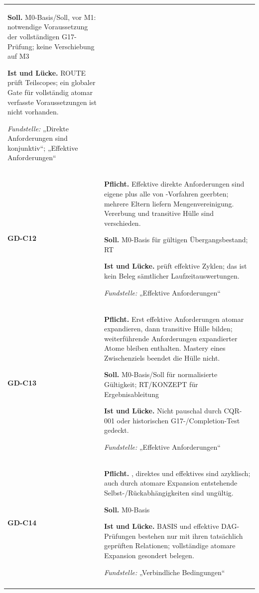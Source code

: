 \begin{longtable}{@{}P{20mm}P{128mm}@{}}
\textbf{Soll.} M0-Basis/Soll, vor M1: notwendige Voraussetzung der vollständigen G17-Prüfung; keine Verschiebung auf M3\par\smallskip
\textbf{Ist und Lücke.} ROUTE prüft Teilscopes; ein globaler Gate für vollständig atomar verfasste Voraussetzungen ist nicht vorhanden.\par\smallskip
\emph{Fundstelle:} „Direkte Anforderungen sind konjunktiv“; „Effektive Anforderungen“\\\addlinespace[5pt]
\label{rule:GD-C12}\textbf{GD-C12} &
\textbf{Pflicht.} Effektive direkte Anforderungen sind eigene plus alle von -Vorfahren geerbten; mehrere Eltern liefern Mengenvereinigung. Vererbung und transitive Hülle sind verschieden.\par\smallskip
\textbf{Soll.} M0-Basis für gültigen Übergangsbestand; RT\par\smallskip
\textbf{Ist und Lücke.}  prüft effektive Zyklen; das ist kein Beleg sämtlicher Laufzeitauswertungen.\par\smallskip
\emph{Fundstelle:} „Effektive Anforderungen“\\\addlinespace[5pt]
\label{rule:GD-C13}\textbf{GD-C13} &
\textbf{Pflicht.} Erst effektive Anforderungen atomar expandieren, dann transitive Hülle bilden; weiterführende Anforderungen expandierter Atome bleiben enthalten. Mastery eines Zwischenziels beendet die Hülle nicht.\par\smallskip
\textbf{Soll.} M0-Basis/Soll für normalisierte Gültigkeit; RT/KONZEPT für Ergebnisableitung\par\smallskip
\textbf{Ist und Lücke.} Nicht pauschal durch CQR-001 oder historischen G17-/Completion-Test gedeckt.\par\smallskip
\emph{Fundstelle:} „Effektive Anforderungen“\\\addlinespace[5pt]
\label{rule:GD-C14}\textbf{GD-C14} &
\textbf{Pflicht.} , direktes  und effektives  sind azyklisch; auch durch atomare Expansion entstehende Selbst-/Rückabhängigkeiten sind ungültig.\par\smallskip
\textbf{Soll.} M0-Basis\par\smallskip
\textbf{Ist und Lücke.} BASIS und effektive DAG-Prüfungen bestehen nur mit ihren tatsächlich geprüften Relationen; vollständige atomare Expansion gesondert belegen.\par\smallskip
\emph{Fundstelle:} „Verbindliche Bedingungen“\\\addlinespace[5pt]

\end{longtable}
